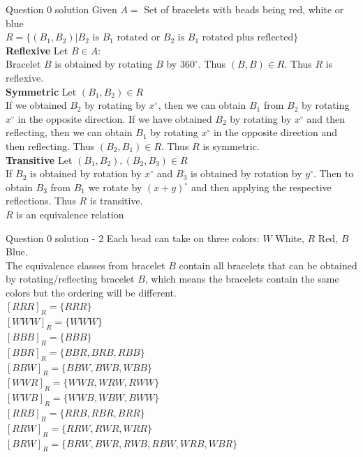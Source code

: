 \documentclass[xcolor=svgnames]{beamer}
\begin{document}
\begin{frame}{Question 0 solution}
    Given $A = $ Set of bracelets with beads being red, white or blue \\ 
    $R = \{(B_1, B_2) | B_2 \text{ is } B_1 \text{ rotated or } B_2 \text{ is } B_1 \text{ rotated plus reflected} \}$ \\
    \textbf{Reflexive} Let $B \in A$:\\
    Bracelet $B$ is obtained by rotating $B$ by $360^\circ$. Thus $(B, B) \in R$. Thus $R$ is reflexive. \\
    \textbf{Symmetric} Let $(B_1, B_2) \in R$ \\
    If we obtained $B_2$ by rotating by $x^\circ$, then we can obtain $B_1$ from $B_2$ by rotating $x^\circ$ in the opposite direction. If we have obtained $B_2$ by rotating by $x^\circ$ and then reflecting, then we can obtain $B_1$ by rotating $x^\circ$ in the opposite direction and then reflecting. Thus $(B_2, B_1) \in R$. Thus $R$ is symmetric.\\
    \textbf{Transitive} Let $(B_1, B_2), (B_2, B_3) \in R$ \\
    If $B_2$ is obtained by rotation by $x^\circ$ and $B_3$ is obtained by rotation by $y^\circ$. Then to obtain $B_3$ from $B_1$ we rotate by $(x + y)^\circ$ and then applying the respective reflections. Thus $R$ is transitive.\\
    $R$ is an equivalence relation
\end{frame}

\begin{frame}{Question 0 solution - 2}
    Each bead can take on three colors: $W$ White, $R$ Red, $B$ Blue. \\
    The equivalence classes from bracelet $B$ contain all bracelets that can be obtained by rotating/reflecting bracelet $B$, which means the bracelets contain the same colors but the ordering will be different. \\
    $[RRR]_R = \{RRR\}$ \\
    $[WWW]_R = \{WWW\}$ \\
    $[BBB]_R = \{BBB\}$ \\
    $[BBR]_R = \{BBR, BRB, RBB\}$ \\
    $[BBW]_R = \{BBW, BWB, WBB\}$ \\
    $[WWR]_R = \{WWR, WRW, RWW\}$ \\
    $[WWB]_R = \{WWB, WBW, BWW\}$ \\
    $[RRB]_R = \{RRB, RBR, BRR\}$ \\
    $[RRW]_R = \{RRW, RWR, WRR\}$ \\
    $[BRW]_R = \{BRW, BWR, RWB, RBW, WRB, WBR\}$
\end{frame}
\end{document}
